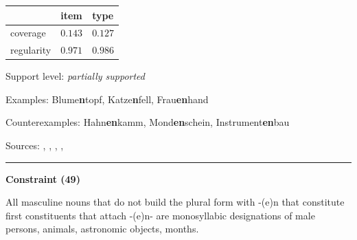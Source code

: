 \vspace{-0.25em}

\begin{table}[!ht]
\begin{center}
\setlength{\extrarowheight}{1pt}
\begin{tabularx}{\columnwidth}{|X|X|X|}
\hline
 & item & type \\
\hline
 coverage & $0.143$ & $0.127$ \\
\hline
 regularity & $0.971$ & $0.986$ \\
\hline
\end{tabularx}
\end{center}
\end{table}

\vspace{-1.35em}

\noindent
Support level: \textit{partially supported}

\vspace{0.3em}

\noindent
Examples: Blume\textbf{n}topf, Katze\textbf{n}fell, Frau\textbf{en}hand

\noindent
Counterexamples: Hahn\textbf{en}kamm, Mond\textbf{en}schein, Instrument\textbf{en}bau

\vspace{0.3em}

\noindent
Sources: \citet[187]{kopf_2017}, \citet[118, 119]{kuerschner_2005}, \citet[9]{kuerschner_2010}, \citet[3]{nuebling_szczepaniak_2008}, \citet[79, 84]{nuebling_szczepaniak_2013}

\vspace{0.35em}
\hrule




\vspace{0.4em}

\begin{center}
\textbf{Constraint (49)}
\end{center}

\noindent
All masculine nouns that do not build the plural form with -(e)n that constitute first constituents that attach -(e)n- are monosyllabic designations of male persons, animals, astronomic objects, months.
\vspace{0.5em}


